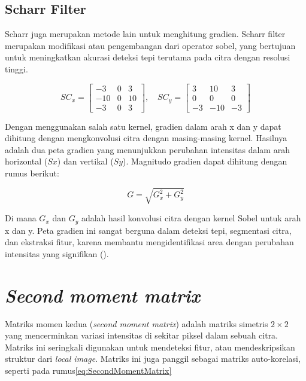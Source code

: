 \subsection{Scharr Filter}
  Scharr juga merupakan metode lain untuk menghitung gradien. Scharr filter merupakan modifikasi atau pengembangan dari operator sobel, yang bertujuan untuk meningkatkan akurasi deteksi tepi terutama pada citra dengan resolusi tinggi.

\begin{equation*}
  SC_x = \begin{bmatrix}
     -3 & 0 & 3 \\
     -10 & 0 & 10 \\
      -3 & 0 & 3
  \end{bmatrix}, \quad
    SC_y = \begin{bmatrix}
      3 & 10 & 3 \\
      0 & 0 & 0 \\
     -3 & -10 & -3
  \end{bmatrix}  
\end{equation*}

Dengan menggunakan salah satu kernel, gradien dalam arah x dan y dapat dihitung dengan mengkonvolusi citra dengan masing-masing kernel. Hasilnya adalah dua peta gradien yang menunjukkan perubahan intensitas dalam arah horizontal (\(Sx\)) dan vertikal (\(Sy\)). Magnitudo gradien dapat dihitung dengan rumus berikut:

\begin{equation}
  G = \sqrt{G_x^2 + G_y^2}
\end{equation}

Di mana \(G_x\) dan \(G_y\) adalah hasil konvolusi citra dengan kernel Sobel untuk arah x dan y. Peta gradien ini sangat berguna dalam deteksi tepi, segmentasi citra, dan ekstraksi fitur, karena membantu mengidentifikasi area dengan perubahan intensitas yang signifikan (\cite{Sanchez2018}).


\section{\emph{Second moment matrix}}
  Matriks momen kedua (\emph{second moment matrix}) adalah matriks simetris \(2 \times 2\) yang mencerminkan variasi intensitas di sekitar piksel dalam sebuah citra. Matriks ini seringkali digunakan untuk mendeteksi fitur, atau mendeskripsikan struktur dari \emph{local image}.
Matriks ini juga panggil sebagai matriks auto-korelasi, seperti pada rumus\ref{eq:SecondMomentMatrix}

